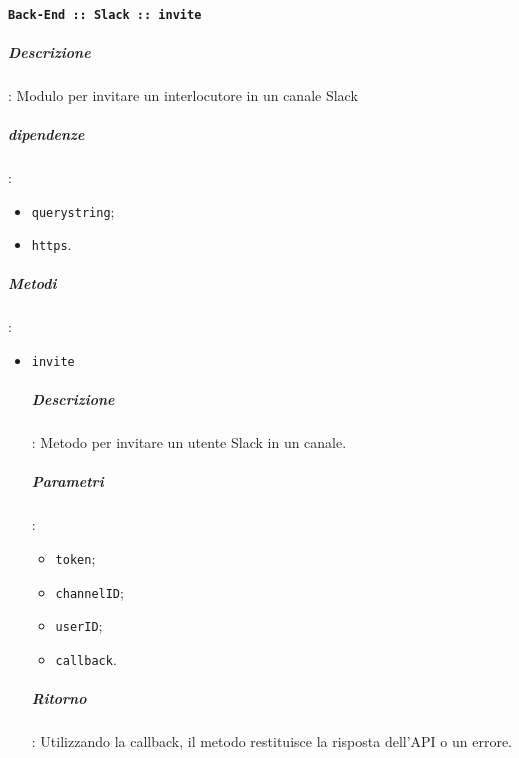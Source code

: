 \documentclass[../DefinizioneDiProdotto_v3.0.0.tex]{subfiles}
\begin{document}
\paragraph{\texttt{Back-End :: Slack :: invite}}
\subparagraph{Descrizione}: Modulo per invitare un interlocutore in un canale Slack
\subparagraph{dipendenze}:
\begin{itemize}
	\item \texttt{querystring};
	\item \texttt{https}.
\end{itemize}
\subparagraph{Metodi}:
\begin{itemize}
	\item \texttt{invite}
	      \subparagraph{Descrizione}: Metodo per invitare un utente Slack in un canale.
	      \subparagraph{Parametri}:
	      \begin{itemize}
	      	\item \texttt{token};
	      	\item \texttt{channelID};
	      	\item \texttt{userID};
	      	\item \texttt{callback}.
	      \end{itemize}
	      \subparagraph{Ritorno}: Utilizzando la callback, il metodo restituisce la risposta dell'API o un errore.
\end{itemize}
\end{document}
